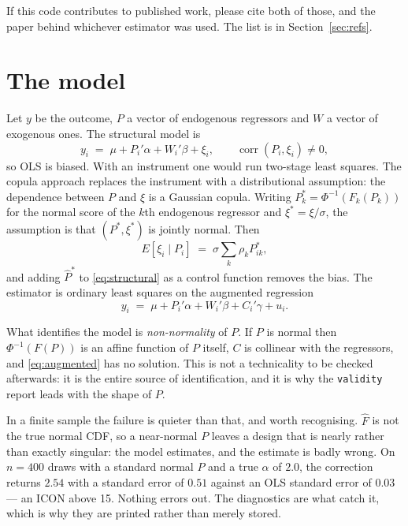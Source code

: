 \documentclass[11pt]{article}
\newcommand{\stcmd}[1]{\texttt{#1}}
\begin{document}
If this code contributes to published work, please cite both of those, and the
paper behind whichever estimator was used. The list is in
Section~\ref{sec:refs}.

\section{The model}

Let $y$ be the outcome, $P$ a vector of endogenous regressors and $W$ a vector
of exogenous ones. The structural model is
\begin{equation}
y_i \;=\; \mu + P_i'\alpha + W_i'\beta + \xi_i ,
\qquad \operatorname{corr}(P_i, \xi_i) \neq 0 ,
\label{eq:structural}
\end{equation}
so OLS is biased. With an instrument one would run two-stage least squares.
The copula approach replaces the instrument with a distributional assumption:
the dependence between $P$ and $\xi$ is a Gaussian copula. Writing
$P^*_k = \Phi^{-1}(F_k(P_k))$ for the normal score of the $k$th endogenous
regressor and $\xi^* = \xi/\sigma$, the assumption is that $(P^*, \xi^*)$ is
jointly normal. Then
\begin{equation}
E[\xi_i \mid P_i] \;=\; \sigma \sum_k \rho_k P^*_{ik},
\label{eq:cf}
\end{equation}
and adding $\hat P^*$ to \eqref{eq:structural} as a control function removes
the bias. The estimator is ordinary least squares on the augmented regression
\begin{equation}
y_i \;=\; \mu + P_i'\alpha + W_i'\beta + C_i'\gamma + u_i .
\label{eq:augmented}
\end{equation}

What identifies the model is \emph{non-normality} of $P$. If $P$ is normal
then $\Phi^{-1}(F(P))$ is an affine function of $P$ itself, $C$ is collinear
with the regressors, and \eqref{eq:augmented} has no solution. This is not a
technicality to be checked afterwards: it is the entire source of
identification, and it is why the \stcmd{validity} report leads with the
shape of $P$.

In a finite sample the failure is quieter than that, and worth recognising.
$\hat F$ is not the true normal CDF, so a near-normal $P$ leaves a design that
is nearly rather than exactly singular: the model estimates, and the estimate
is badly wrong. On $n = 400$ draws with a standard normal $P$ and a true
$\alpha$ of $2.0$, the correction returns $2.54$ with a standard error of
$0.51$ against an OLS standard error of $0.03$ --- an ICON above 15. Nothing
errors out. The diagnostics are what catch it, which is why they are printed
rather than merely stored.
\end{document}
